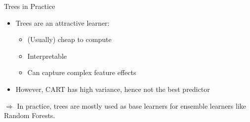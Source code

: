 \documentclass[11pt,compress,t,notes=noshow, xcolor=table]{beamer}
\begin{document}
\begin{vbframe}{Trees in Practice}

\begin{itemize}
\item Trees are an attractive learner:
\begin{itemize}
\item (Usually) cheap to compute
\item Interpretable
\item Can capture complex feature effects
\end{itemize}
\item However, CART has high variance, hence not the best predictor
\end{itemize}
$\Rightarrow$ In practice, trees are mostly used as base learners for ensemble learners like Random Forests.
\end{vbframe}










\endlecture
\end{document}
